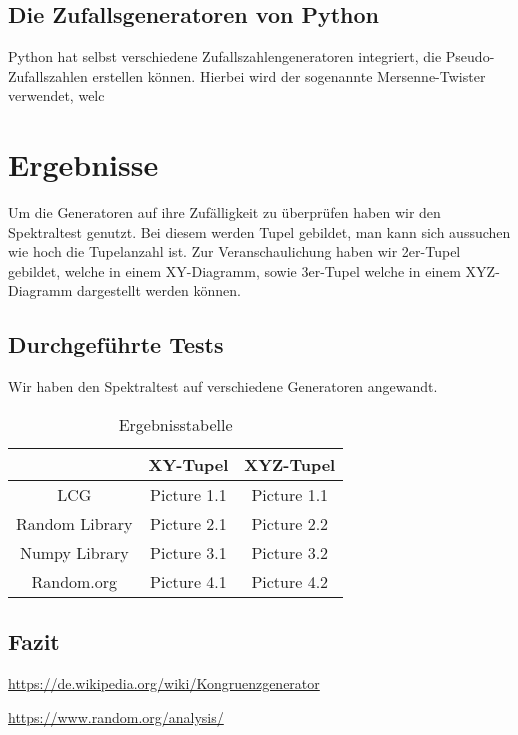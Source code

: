 \documentclass[12pt]{article}
\begin{document}
    \subsection{Die Zufallsgeneratoren von Python}\label{subsec:die-zufallsgeneratoren-von-python}
    Python hat selbst verschiedene Zufallszahlengeneratoren integriert, die Pseudo-Zufallszahlen erstellen können.
    Hierbei wird der sogenannte Mersenne-Twister verwendet, welc







    \section{Ergebnisse}\label{sec:Ergebnisse}
    Um die Generatoren auf ihre Zufälligkeit zu überprüfen haben wir den Spektraltest genutzt.
    Bei diesem werden Tupel gebildet, man kann sich aussuchen wie hoch die Tupelanzahl ist.
    Zur Veranschaulichung haben wir 2er-Tupel gebildet, welche in einem XY-Diagramm, sowie 3er-Tupel welche in einem
    XYZ-Diagramm dargestellt werden können.

    \subsection{Durchgeführte Tests}\label{subsec:durchgeführte-tests}
    Wir haben den Spektraltest auf verschiedene Generatoren angewandt.

    \begin{table}[h]

        \caption[Ergebnisstabelle]{Ergebnisstabelle}

        \centering

        \begin{tabular}{|c||c|c|}

            \hline
            & XY-Tupel & XYZ-Tupel \\

            \hline
            \hline
            LCG & Picture 1.1 & Picture 1.1 \\

            \hline
            Random Library & Picture 2.1 & Picture 2.2 \\

            \hline
            Numpy Library & Picture 3.1 & Picture 3.2 \\

            \hline
            Random.org & Picture 4.1 & Picture 4.2 \\

            \hline

        \end{tabular}\label{tab:ergebnisse}

    \end{table}

    \subsection{Fazit}\label{subsec:fazit}

    \vfill

    \begin{thebibliography}{12345}

        \url{https://de.wikipedia.org/wiki/Kongruenzgenerator}

        \url{https://www.random.org/analysis/}

    \end{thebibliography}
\end{document}
